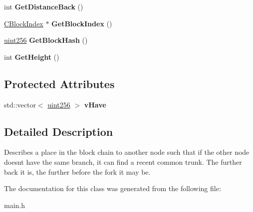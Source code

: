 \begin{DoxyCompactItemize}
int {\bfseries Get\+Distance\+Back} ()
\item 
\mbox{\label{class_c_block_locator_a9109609622705fe47ec42ecc71c59d48}} 
\mbox{\hyperlink{class_c_block_index}{C\+Block\+Index}} $\ast$ {\bfseries Get\+Block\+Index} ()
\item 
\mbox{\label{class_c_block_locator_ac15bd658550c7b803eb39171ed65d4aa}} 
\mbox{\hyperlink{classuint256}{uint256}} {\bfseries Get\+Block\+Hash} ()
\item 
\mbox{\label{class_c_block_locator_aea0d210a819144632f4260e1b4d0fe60}} 
int {\bfseries Get\+Height} ()
\end{DoxyCompactItemize}
\subsection*{Protected Attributes}
\begin{DoxyCompactItemize}
\item 
\mbox{\label{class_c_block_locator_a745204ecd8c9326b43ac54d7f780534f}} 
std\+::vector$<$ \mbox{\hyperlink{classuint256}{uint256}} $>$ {\bfseries v\+Have}
\end{DoxyCompactItemize}


\subsection{Detailed Description}
Describes a place in the block chain to another node such that if the other node doesn\textquotesingle{}t have the same branch, it can find a recent common trunk. The further back it is, the further before the fork it may be. 

The documentation for this class was generated from the following file\+:\begin{DoxyCompactItemize}
\item 
main.\+h\end{DoxyCompactItemize}
